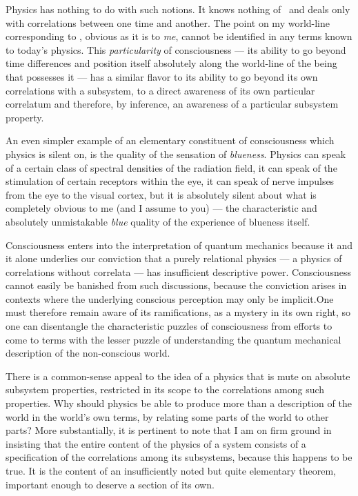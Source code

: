 Physics has nothing to do with such notions.  It knows nothing of
\now\ and deals only with correlations between one time and another.
The point on my world-line corresponding to \now, obvious as it is to
{\it me\/}, cannot be identified in any terms known to today's
physics.  This {\it particularity\/} of consciousness --- its ability
to go beyond time differences and position itself absolutely along the
world-line of the being that possesses it --- has a similar flavor to
its ability to go beyond its own correlations with a subsystem, to a
direct awareness of its own particular correlatum and therefore, by
inference, an awareness of a particular subsystem
property.\fn

An even simpler example of an elementary constituent of consciousness
which physics is silent on, is the quality of the sensation
of {\it blueness\/}.  Physics can speak of a certain class of
spectral densities of the radiation field, it can speak of the
stimulation of certain receptors within the eye, it can speak of nerve
impulses from the eye to the visual cortex, but it is absolutely
silent about what is completely obvious to me (and I assume to you)
--- the characteristic and absolutely unmistakable {\it blue\/} quality
of the experience of blueness itself.\fn  

Consciousness enters into the interpretation of quantum mechanics
because it and it alone underlies our conviction that a purely relational
physics --- a physics of correlations without correlata --- has
insufficient descriptive power.  Consciousness cannot easily be banished from
such discussions, because the conviction arises in contexts where the
underlying conscious perception may only be implicit.\fn  One must
therefore remain aware of its ramifications, as a mystery in its own
right, so one can disentangle the characteristic puzzles of
consciousness from efforts to come to terms with the lesser puzzle of
understanding the quantum mechanical description of the non-conscious
world.\fn

\bigskip {}
\nobreak\medskip\nobreak There is a common-sense appeal to the idea of
a physics that is mute on absolute subsystem properties, restricted in
its scope to the correlations among such properties.  Why should
physics be able to produce more than a description of the world in the
world's own terms, by relating some parts of the world to other parts?
More substantially, it is pertinent to note that I am on firm ground
in insisting that the entire content of the physics of a system
consists of a specification of the correlations among its subsystems,
because this happens to be true.  It is the content of an
insufficiently noted but quite elementary theorem, important enough to
deserve a section of its own.

